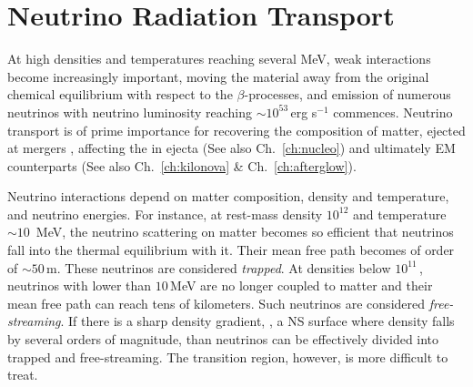 
\section{Neutrino Radiation Transport}\label{sec:nr_methods:neut}



At high densities and temperatures reaching several MeV, weak interactions  become 
increasingly important, moving the material away from the original chemical equilibrium 
with respect to the $\beta$-processes, and emission of numerous neutrinos with neutrino luminosity 
reaching $\sim10^{53}\,$erg s$^{-1}$ commences. 
%
Neutrino transport is of prime importance for recovering the composition of matter, 
ejected at mergers  \citep{Wanajo:2014wha,Sekiguchi:2015dma,Foucart:2015vpa,Foucart:2015gaa},
affecting the \nuc{} in ejecta \citep{Wanajo:2014wha,Goriely:2015fqa} 
(See also Ch.~\ref{ch:nucleo})
and ultimately \ac{EM} counterparts 
\citep{Metzger:2014ila,Lippuner:2015gwa} (See also Ch.~\ref{ch:kilonova} \& Ch.~\ref{ch:afterglow}).

Neutrino interactions depend on matter composition, density and temperature, 
and neutrino energies. For instance, at rest-mass density $10^{12}$\gcm{} 
and temperature $\sim10$~MeV, the neutrino scattering on matter becomes so efficient 
that neutrinos fall into the thermal equilibrium with it. Their mean free path 
becomes of order of $\sim 50\,$m. These neutrinos are considered \textit{trapped}.
%
At densities below $10^{11}\,$\gcm, neutrinos with lower than $10\,$MeV 
are no longer coupled to matter and their mean free path can reach tens 
of kilometers. Such neutrinos are considered \textit{free-streaming}.
%
If there is a sharp density gradient, \eg, a \ac{NS} surface 
where density falls by several orders of magnitude, than neutrinos can be effectively 
divided into trapped and free-streaming. The transition region, however, 
is more difficult to treat.

